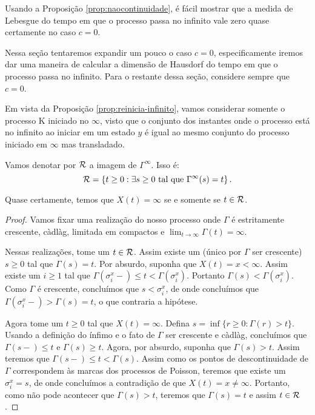 Usando a Proposição \ref{prop:naocontinuidade}, é fácil mostrar que a
medida de Lebesgue do tempo em que o processo passa no infinito vale
zero quase certamente no caso $c = 0$.

Nessa seção tentaremos expandir um pouco o caso $c = 0$,
especificamente iremos dar uma maneira de calcular a dimensão de
Hausdorf do tempo em que o processo passa no infinito.  Para o
restante dessa seção, considere sempre que $c = 0$.

Em vista da Proposição \ref{prop:reinicia-infinito}, vamos considerar
somente o processo K iniciado no $\infty$, visto que o conjunto dos
instantes onde o processo está no infinito ao iniciar em um estado $y$
é igual ao mesmo conjunto do processo iniciado em $\infty$ mas
transladado.

\begin{definicao}
  Vamos denotar por ${\mathcal{R}}$ a imagem de $\Gamma^\infty$. Isso é:
  \begin{displaymath}
    {\mathcal{R}} = \left\{
      t \geq 0 : \exists s \geq 0 \textrm{ tal que } \Gamma^\infty(s) = t
    \right\}.
  \end{displaymath}
\end{definicao}

\begin{proposicao}
  Quase certamente, temos que $X(t) = \infty$ se e somente se $t \in {\mathcal{R}}$.
\end{proposicao}
\begin{proof}
  Vamos fixar uma realização do nosso processo onde $\Gamma$ é
  estritamente crescente, càdlàg, limitada em compactos e $\lim_{t \to
    \infty} \Gamma(t) = \infty$.

  Nessas realizações, tome um $t \in {\mathcal{R}}$. Assim existe um (único por
  $\Gamma$ ser crescente) $s \geq 0$ tal que $\Gamma(s) = t$. Por
  absurdo, suponha que $X(t) = x < \infty$. Assim existe um $i \geq 1$
  tal que $\Gamma(\sigma_i^x -) \leq t < \Gamma(\sigma_i^x)$. Portanto
  $\Gamma(s) < \Gamma(\sigma_i^x)$. Como $\Gamma$ é crescente,
  concluímos que $s < \sigma_i^x$, de onde concluímos que
  $\Gamma(\sigma_i^x-) > \Gamma(s) = t$, o que contraria a hipótese.

  Agora tome um $t \geq 0$ tal que $X(t) = \infty$. Defina $s = \inf
  \{ r \geq 0 :  \Gamma(r) > t \}$. Usando a definição do ínfimo e o
  fato de $\Gamma$ ser crescente e càdlàg, concluímos que $\Gamma(s-)
  \leq t$ e $\Gamma(s) \geq t$. Agora, por absurdo, suponha que
  $\Gamma(s) > t$. Assim teremos que $\Gamma(s-) \leq t <
  \Gamma(s)$. Assim como os pontos de descontinuidade de $\Gamma$
  correspondem às marcas dos processos de Poisson, teremos que existe
  um $\sigma_i^x = s$, de onde concluímos a contradição de que $X(t) =
  x \neq \infty$. Portanto, como não pode acontecer que $\Gamma(s) >
  t$, teremos que $\Gamma(s) = t$ e assim $t \in {\mathcal{R}}$.
\end{proof}


